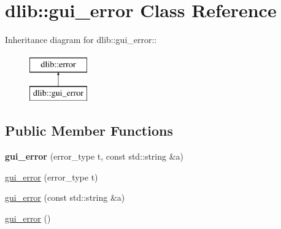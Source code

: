 \hypertarget{classdlib_1_1gui__error}{
\section{dlib::gui\_\-error Class Reference}
\label{classdlib_1_1gui__error}
}
Inheritance diagram for dlib::gui\_\-error::\begin{figure}[H]
\begin{center}
\leavevmode
\includegraphics[height=2cm]{classdlib_1_1gui__error}
\end{center}
\end{figure}
\subsection*{Public Member Functions}
\begin{DoxyCompactItemize}
\item 
\hypertarget{classdlib_1_1gui__error_a77ec8eaf03541778946228b13be67564}{
{\bfseries gui\_\-error} (error\_\-type t, const std::string \&a)}
\label{classdlib_1_1gui__error_a77ec8eaf03541778946228b13be67564}

\item 
\hyperlink{classdlib_1_1gui__error_a79df44246d54d45905564cabd8ea0a6e}{gui\_\-error} (error\_\-type t)
\item 
\hyperlink{classdlib_1_1gui__error_a695fa7a02393b2154db455350fc9ab9c}{gui\_\-error} (const std::string \&a)
\item 
\hyperlink{classdlib_1_1gui__error_a12b91b87302cdcb3e727f4970b1f8453}{gui\_\-error} ()
\end{DoxyCompactItemize}


